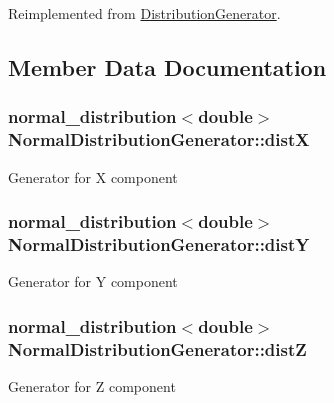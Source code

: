 Reimplemented from \hyperlink{class_distribution_generator_ae4fa2d599942539e4b1971b0a8d5f8ba}{Distribution\+Generator}.



\subsection{Member Data Documentation}
\subsubsection[{\texorpdfstring{distX}{distX}}]{\setlength{\rightskip}{0pt plus 5cm}normal\+\_\+distribution$<$double$>$ Normal\+Distribution\+Generator\+::distX\hspace{0.3cm}{\ttfamily [private]}}\hypertarget{class_normal_distribution_generator_aec239e19cb64a14f812b4d70bb1d3c38}{}\label{class_normal_distribution_generator_aec239e19cb64a14f812b4d70bb1d3c38}
Generator for X component 
\subsubsection[{\texorpdfstring{distY}{distY}}]{\setlength{\rightskip}{0pt plus 5cm}normal\+\_\+distribution$<$double$>$ Normal\+Distribution\+Generator\+::distY\hspace{0.3cm}{\ttfamily [private]}}\hypertarget{class_normal_distribution_generator_aeb225a80caf342a1cf198a8550fecd7c}{}\label{class_normal_distribution_generator_aeb225a80caf342a1cf198a8550fecd7c}
Generator for Y component 
\subsubsection[{\texorpdfstring{distZ}{distZ}}]{\setlength{\rightskip}{0pt plus 5cm}normal\+\_\+distribution$<$double$>$ Normal\+Distribution\+Generator\+::distZ\hspace{0.3cm}{\ttfamily [private]}}\hypertarget{class_normal_distribution_generator_a266178f74bb9983818a05edec742717e}{}\label{class_normal_distribution_generator_a266178f74bb9983818a05edec742717e}
Generator for Z component 
